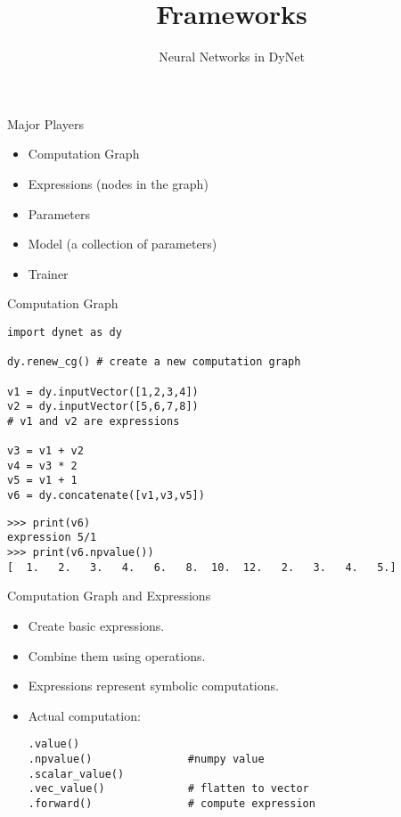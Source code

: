 \documentclass[compress]{beamer}
\title{Frameworks}
\date{Neural Networks in DyNet}
\begin{document}

\begin{frame}{Major Players}

\begin{itemize}
\item Computation Graph
\item Expressions (nodes in the graph)
\item Parameters
\item Model (a collection of parameters)
\item Trainer
\end{itemize}

\end{frame}

\begin{frame}[fragile]{Computation Graph}

\begin{verbatim}
import dynet as dy

dy.renew_cg() # create a new computation graph

v1 = dy.inputVector([1,2,3,4])
v2 = dy.inputVector([5,6,7,8])
# v1 and v2 are expressions

v3 = v1 + v2
v4 = v3 * 2
v5 = v1 + 1
v6 = dy.concatenate([v1,v3,v5])
\end{verbatim}
\pause

\begin{verbatim}
>>> print(v6)
expression 5/1
>>> print(v6.npvalue())
[  1.   2.   3.   4.   6.   8.  10.  12.   2.   3.   4.   5.]
\end{verbatim}

\end{frame}


\begin{frame}[fragile]{Computation Graph and Expressions}

\begin{itemize}
\item Create basic expressions.
\item Combine them using operations.
\item Expressions represent symbolic computations.
\item Actual computation:

\begin{verbatim}
.value()
.npvalue()               #numpy value
.scalar_value()
.vec_value()             # flatten to vector
.forward()               # compute expression
\end{verbatim}

\end{itemize}

\end{frame}
\end{document}
